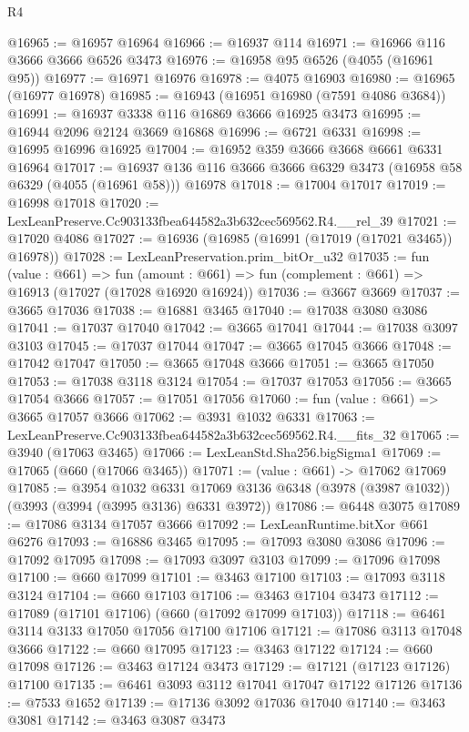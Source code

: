 \begin{lexlean}{R4}
\begin{coremodule}
@16965 := @16957 @16964
@16966 := @16937 @114
@16971 := @16966 @116 @3666 @3666 @6526 @3473
@16976 := @16958 @95 @6526 (@4055 (@16961 @95))
@16977 := @16971 @16976
@16978 := @4075 @16903
@16980 := @16965 (@16977 @16978)
@16985 := @16943 (@16951 @16980 (@7591 @4086 @3684))
@16991 := @16937 @3338 @116 @16869 @3666 @16925 @3473
@16995 := @16944 @2096 @2124 @3669 @16868
@16996 := @6721 @6331
@16998 := @16995 @16996 @16925
@17004 := @16952 @359 @3666 @3668 @6661 @6331 @16964
@17017 := @16937 @136 @116 @3666 @3666 @6329 @3473 (@16958 @58 @6329 (@4055 (@16961 @58))) @16978
@17018 := @17004 @17017
@17019 := @16998 @17018
@17020 := LexLeanPreserve.Cc903133fbea644582a3b632cec569562.R4.__rel_39
@17021 := @17020 @4086
@17027 := @16936 (@16985 (@16991 (@17019 (@17021 @3465)) @16978))
@17028 := LexLeanPreservation.prim_bitOr_u32
@17035 := fun (value : @661) =>
  fun (amount : @661) => fun (complement : @661) => @16913 (@17027 (@17028 @16920 @16924))
@17036 := @3667 @3669
@17037 := @3665 @17036
@17038 := @16881 @3465
@17040 := @17038 @3080 @3086
@17041 := @17037 @17040
@17042 := @3665 @17041
@17044 := @17038 @3097 @3103
@17045 := @17037 @17044
@17047 := @3665 @17045 @3666
@17048 := @17042 @17047
@17050 := @3665 @17048 @3666
@17051 := @3665 @17050
@17053 := @17038 @3118 @3124
@17054 := @17037 @17053
@17056 := @3665 @17054 @3666
@17057 := @17051 @17056
@17060 := fun (value : @661) => @3665 @17057 @3666
@17062 := @3931 @1032 @6331
@17063 := LexLeanPreserve.Cc903133fbea644582a3b632cec569562.R4.__fits_32
@17065 := @3940 (@17063 @3465)
@17066 := LexLeanStd.Sha256.bigSigma1
@17069 := @17065 (@660 (@17066 @3465))
@17071 := (value : @661) -> @17062 @17069
@17085 := @3954
    @1032
    @6331
    @17069
    @3136
    @6348
    (@3978 (@3987 @1032))
    (@3993 (@3994 (@3995 @3136) @6331 @3972))
@17086 := @6448 @3075
@17089 := @17086 @3134 @17057 @3666
@17092 := LexLeanRuntime.bitXor @661 @6276
@17093 := @16886 @3465
@17095 := @17093 @3080 @3086
@17096 := @17092 @17095
@17098 := @17093 @3097 @3103
@17099 := @17096 @17098
@17100 := @660 @17099
@17101 := @3463 @17100
@17103 := @17093 @3118 @3124
@17104 := @660 @17103
@17106 := @3463 @17104 @3473
@17112 := @17089 (@17101 @17106) (@660 (@17092 @17099 @17103))
@17118 := @6461 @3114 @3133 @17050 @17056 @17100 @17106
@17121 := @17086 @3113 @17048 @3666
@17122 := @660 @17095
@17123 := @3463 @17122
@17124 := @660 @17098
@17126 := @3463 @17124 @3473
@17129 := @17121 (@17123 @17126) @17100
@17135 := @6461 @3093 @3112 @17041 @17047 @17122 @17126
@17136 := @7533 @1652
@17139 := @17136 @3092 @17036 @17040
@17140 := @3463 @3081
@17142 := @3463 @3087 @3473

\end{coremodule}
\end{lexlean}
